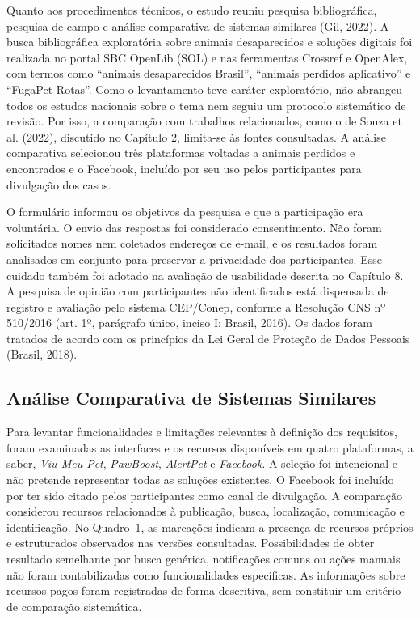 Quanto aos procedimentos técnicos, o estudo reuniu pesquisa bibliográfica, pesquisa de campo e análise comparativa de sistemas similares (Gil, 2022). A busca bibliográfica exploratória sobre animais desaparecidos e soluções digitais foi realizada no portal SBC OpenLib (SOL) e nas ferramentas Crossref e OpenAlex, com termos como ``animais desaparecidos Brasil'', ``animais perdidos aplicativo'' e ``FugaPet-Rotas''. Como o levantamento teve caráter exploratório, não abrangeu todos os estudos nacionais sobre o tema nem seguiu um protocolo sistemático de revisão. Por isso, a comparação com trabalhos relacionados, como o de Souza et al. (2022), discutido no Capítulo 2, limita-se às fontes consultadas. A análise comparativa selecionou três plataformas voltadas a animais perdidos e encontrados e o Facebook, incluído por seu uso pelos participantes para divulgação dos casos.

O formulário informou os objetivos da pesquisa e que a participação era voluntária. O envio das respostas foi considerado consentimento. Não foram solicitados nomes nem coletados endereços de e-mail, e os resultados foram analisados em conjunto para preservar a privacidade dos participantes. Esse cuidado também foi adotado na avaliação de usabilidade descrita no Capítulo 8. A pesquisa de opinião com participantes não identificados está dispensada de registro e avaliação pelo sistema CEP/Conep, conforme a Resolução CNS nº 510/2016 (art. 1º, parágrafo único, inciso I; Brasil, 2016). Os dados foram tratados de acordo com os princípios da Lei Geral de Proteção de Dados Pessoais (Brasil, 2018).



\subsection{Análise Comparativa de Sistemas Similares}

Para levantar funcionalidades e limitações relevantes à definição dos requisitos, foram examinadas as interfaces e os recursos disponíveis em quatro plataformas, a saber, \textit{Viu Meu Pet}, \textit{PawBoost}, \textit{AlertPet} e \textit{Facebook}. A seleção foi intencional e não pretende representar todas as soluções existentes. O Facebook foi incluído por ter sido citado pelos participantes como canal de divulgação. A comparação considerou recursos relacionados à publicação, busca, localização, comunicação e identificação. No Quadro~1, as marcações indicam a presença de recursos próprios e estruturados observados nas versões consultadas. Possibilidades de obter resultado semelhante por busca genérica, notificações comuns ou ações manuais não foram contabilizadas como funcionalidades específicas. As informações sobre recursos pagos foram registradas de forma descritiva, sem constituir um critério de comparação sistemática.


